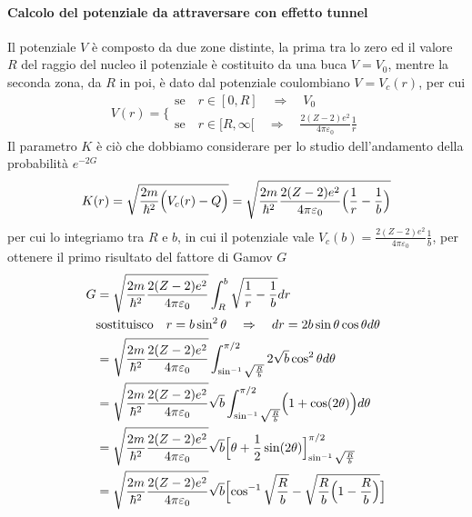 \paragraph{Calcolo del potenziale da attraversare con effetto tunnel}
Il potenziale $V$ è composto da due zone distinte, la prima tra lo zero ed il valore $R$ del raggio del nucleo il potenziale è costituito da una buca $V=V_0$, mentre la seconda zona, da $R$ in poi, è dato dal potenziale coulombiano $V=V_c(r)$, per cui 
\begin{equation}
V(r) =
\Bigg\{\begin{array}{l}
\mbox{se}\quad r \in [ 0, R ] \quad\Rightarrow\quad  V_0  \\
\mbox{se}\quad r \in [ R, \infty [ \quad\Rightarrow\quad \frac{2(Z-2)e^2}{4 \pi \varepsilon_0} \frac{1}{r} 
\end{array}
\end{equation}
Il parametro $K$ è ciò che dobbiamo considerare per lo studio dell'andamento della probabilità $e^{-2 G}$
\begin{equation}
K(r) = \sqrt{ \frac{2m}{\hbar^2} \Bigl(  V_c(r) -Q \Bigr) } = \sqrt{ \frac{2m}{\hbar^2} \frac{2(Z-2)e^2}{4 \pi \varepsilon_0} \Bigl(  \frac{1}{r} - \frac{1}{b}  \Bigr) } 
\end{equation}
per cui lo integriamo tra $R$ e $b$, in cui il potenziale vale $V_c(b) = \frac{2(Z-2)e^2}{4 \pi \varepsilon_0} \frac{1}{b}$, per ottenere il primo risultato del fattore di Gamov $G$
\begin{equation}
\begin{split}
G & = \sqrt{ \frac{2m}{\hbar^2} \frac{2(Z-2)e^2}{4 \pi \varepsilon_0} } \int_R^{b} \sqrt{ \frac{1}{r} - \frac{1}{b}  } dr \\
& \mbox{sostituisco} \quad r = b \sin^2 \theta \quad\Rightarrow\quad dr = 2b \sin \theta \cos \theta d\theta \\
& = \sqrt{ \frac{2m}{\hbar^2} \frac{2(Z-2)e^2}{4 \pi \varepsilon_0} } \int_{\sin^{-1}\sqrt{\frac{R}{b}}}^{\pi/2} 2 \sqrt{b} \cos^2 \theta d\theta \\ 
& = \sqrt{ \frac{2m}{\hbar^2} \frac{2(Z-2)e^2}{4 \pi \varepsilon_0} } \sqrt{b} \int_{\sin^{-1}\sqrt{\frac{R}{b}}}^{\pi/2} \Bigl(  1 + \cos(2\theta)  \Bigr) d\theta \\
& = \sqrt{ \frac{2m}{\hbar^2} \frac{2(Z-2)e^2}{4 \pi \varepsilon_0} } \sqrt{b} \Bigl[  \theta + \frac{1}{2}\sin(2\theta)  \Bigr]_{\sin^{-1}\sqrt{\frac{R}{b}}}^{\pi/2} \\
& =\sqrt{ \frac{2m}{\hbar^2} \frac{2(Z-2)e^2}{4 \pi \varepsilon_0} } \sqrt{b} \Bigl[  \cos^{-1}\sqrt{\frac{R}{b}} - \sqrt{\frac{R}{b}\Bigl(  1- \frac{R}{b}   \Bigr)} \Bigr]
\end{split}
\end{equation}
